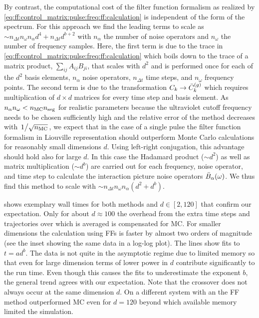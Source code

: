By contrast, the computational cost of the filter function formalism as realized by \cref{eq:ff:control_matrix:pulse:freq:ff:calculation} is independent of the form of the spectrum.
For this approach we find the leading terms to scale as $\sim n_{\Delta t} n_\omega n_\alpha d^{4} + n_{\Delta t} d^{b+2}$ with $n_\alpha$ the number of noise operators and $n_\omega$ the number of frequency samples.
Here, the first term is due to the trace in \cref{eq:ff:control_matrix:pulse:freq:ff:calculation} which boils down to the trace of a matrix product, $\sum_{ij} A_{ij} B_{ji}$, that scales with $d^2$ and is performed once for each of the $d^2$ basis elements, $n_\alpha$ noise operators, $n_{\Delta t}$ time steps, and $n_\omega$ frequency points.
The second term is due to the transformation $C_k\rightarrow\bar{C}^{(g)}_k$ which requires multiplication of $d\times d$ matrices for every time step and basis element.
As $n_\alpha n_\omega < n_{\mathrm{MC}} n_{\mathrm{seg}}$ for realistic parameters because the ultraviolet cutoff frequency needs to be chosen sufficiently high and the relative error of the method decreases with $\flatfrac{1}{\sqrt{n_\mr{MC}}}$, we expect that in the case of a single pulse the filter function formalism in Liouville representation should outperform Monte Carlo calculations for reasonably small dimensions $d$.
Using left-right conjugation, this advantage should hold also for large $d$.
In this case the Hadamard product ($\sim d^2$) as well as matrix multiplication ($\sim d^b$) are carried out for each frequency, noise operator, and time step to calculate the interaction picture noise operators $\bar{B}_\alpha(\omega)$.
We thus find this method to scale with $\sim n_{\Delta t} n_\omega n_\alpha (d^2 + d^b)$.

 shows exemplary wall times for both methods and $d\in[2,120]$ that confirm our expectation.
Only for about $d\approx\num{100}$ the overhead from the extra time steps and trajectories over which is averaged is compensated for MC.
For smaller dimensions the calculation using FFs is faster by almost two orders of magnitude (see the inset showing the same data in a log-log plot).
The lines show fits to $t = a d^b$.
The data is not quite in the asymptotic regime due to limited memory so that even for large dimension terms of lower power in $d$ contribute significantly to the run time.
Even though this causes the fits to underestimate the exponent $b$, the general trend agrees with our expectation.
Note that the crossover does not always occur at the same dimension $d$.
On a different system with an \fastprocessor the FF method outperformed MC even for $d = 120$ beyond which available memory limited the simulation.

